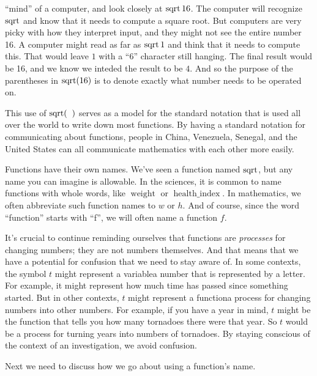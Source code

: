 		``mind'' of a computer, and look closely at $\sq\num{16}$. The computer will recognize $\sq$
		and know that it needs to compute a square root. But computers are very picky with how they interpret input, and 
		they might not see the entire number \num{16}. A computer might read as far as $\sq\num{1}$ and think that it needs to compute this.
		That would leave $1$ with a ``6'' character still hanging. The final result would be \num{16}, and we know we inteded the  
		result to be $4$. And so the purpose of the parentheses in $\sq[\num{16}]$ is 
		to denote exactly what number needs to be operated on.
%
\par This use of $\sq[(]$ serves as a model for the standard notation that is used all over the world to
        	write down most functions. By having a standard notation for communicating about functions,
        	people in China, Venezuela, Senegal, and the United States can all communicate mathematics
        	with each other more easily.
%
\par Functions have their own names. We've seen a function named $\sq$, but any name you can
        	imagine is allowable. In the sciences, it is common to name functions with whole words,
        	like $\operatorname{weight}$ or $\operatorname{health\_index}$. In mathematics, we often
        	abbreviate such function names to $w$ or $h$. And of course, since the word ``function''
        	starts with ``f'', we will often name a function $f$.
%
\par It's crucial to continue reminding ourselves that functions are \emph{processes} for
        	changing numbers; they are not numbers themselves. And that means that we have a potential
        	for confusion that we need to stay aware of. In some contexts, the symbol $t$ might
        	represent a variablea number that is represented by a letter. For example, it might represent 
		how much time has passed since something started. But in other contexts, $t$
        	might represent a functiona process for changing numbers into other numbers. For example, if you 
		have a year in mind, $t$ might be the function that tells you how many tornadoes there were that year. 
		So $t$ would be a process for turning years into numbers of tornadoes. By
        	staying conscious of the context of an investigation, we avoid confusion.
%
\par Next we need to discuss how we go about using a function's name.
%
